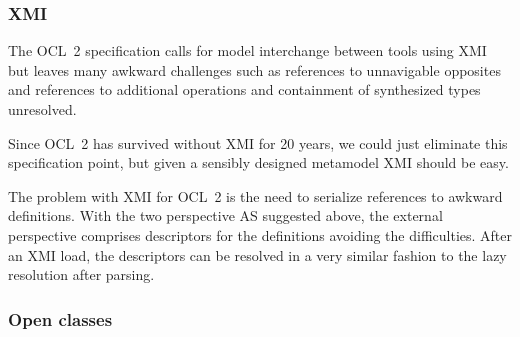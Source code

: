 \documentclass{jot}
\begin{document}






\subsubsection{XMI}

The OCL~2 specification calls for model interchange between tools using XMI but leaves many awkward challenges such as references to unnavigable opposites and references to additional operations and containment of synthesized types unresolved.

Since OCL~2 has survived without XMI for 20 years, we could just eliminate this specification point, but given a sensibly designed metamodel XMI should be easy.

The problem with XMI for OCL~2 is the need to serialize references to awkward definitions. With the two perspective AS suggested above, the external perspective comprises descriptors for the definitions avoiding the difficulties. After an XMI load, the descriptors can be resolved in a very similar fashion to the lazy resolution after parsing.

\subsubsection{Open classes}
\end{document}
